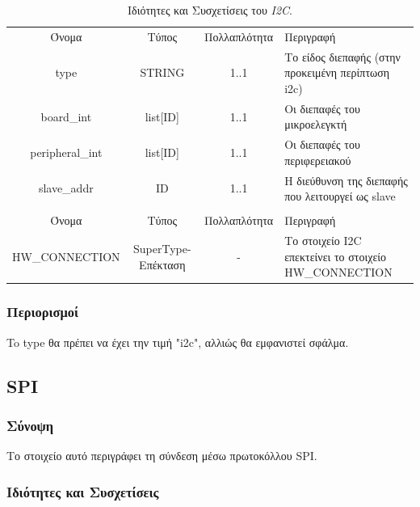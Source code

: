 \begin{table}[H]
	\begin{center}
		\begin{tabular}{ | c | c | c| m{5.5cm} | }
			\hline
			\rowcolor{Gray}
			\multicolumn{4}{|c|}{\textbf{Ιδιότητες}}\\
			\hline
			\rowcolor{Gray}
			Όνομα & Τύπος & Πολλαπλότητα & Περιγραφή \\
			\hline
			type & STRING & 1..1 & Το είδος διεπαφής (στην προκειμένη περίπτωση i2c) \\
			\hline
			board\_int & list[ID] & 1..1 & Οι διεπαφές του μικροελεγκτή \\
			\hline
			peripheral\_int & list[ID] & 1..1 & Οι διεπαφές του περιφερειακού \\
			\hline
			slave\_addr & ID & 1..1 & Η διεύθυνση της διεπαφής που λειτουργεί ως slave \\
			\hline
			\rowcolor{Gray}
			\multicolumn{4}{|c|}{\textbf{Συσχετίσεις}}\\
			\hline
			\rowcolor{Gray}
			Όνομα & Τύπος & Πολλαπλότητα & Περιγραφή \\
			\hline
			\footnotesize{HW\_CONNECTION} & SuperType-Επέκταση & - &  Το στοιχείο I2C επεκτείνει το στοιχείο HW\_CONNECTION \\
			\hline
		\end{tabular}
		\caption{Ιδιότητες και Συσχετίσεις του \textit{I2C}.}
		\label{tab:i2c_con}
	\end{center}
\end{table}

\subsubsection*{Περιορισμοί}

\noindent To type θα πρέπει να έχει την τιμή "i2c", αλλιώς θα εμφανιστεί σφάλμα.

\subsection{SPI}
\label{subsec:spi_con}

\subsubsection*{Σύνοψη}

\noindent Το στοιχείο αυτό περιγράφει τη σύνδεση μέσω πρωτοκόλλου SPI.

\subsubsection*{Ιδιότητες και Συσχετίσεις}


